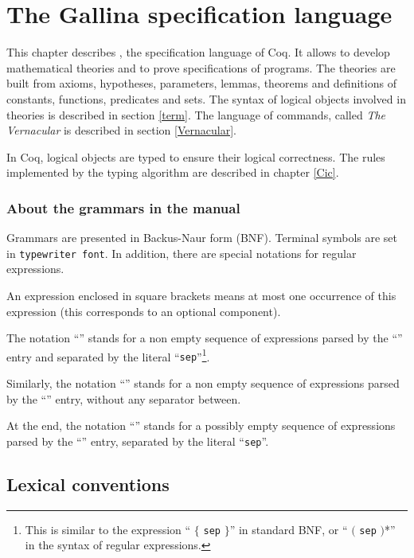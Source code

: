 \chapter{The {\sf Gallina} specification language}
\label{Gallina}

This chapter describes \gallina, the specification language of Coq.
It allows to develop mathematical theories and to prove specifications
of programs.  The theories are built from axioms, hypotheses,
parameters, lemmas, theorems and definitions of constants, functions,
predicates and sets. The syntax of logical objects involved in
theories is described in section \ref{term}. The language of
commands, called {\em The Vernacular} is described in section
\ref{Vernacular}.

In Coq, logical objects are typed to ensure their logical
correctness. The rules implemented by the typing algorithm are described in
chapter \ref{Cic}.

\subsection*{About the grammars in the manual}

Grammars are presented in Backus-Naur form (BNF). Terminal symbols are
set in {\tt typewriter font}.  In addition, there are special
notations for regular expressions.

An expression enclosed in square brackets \zeroone{\ldots} means at
most one occurrence of this expression (this corresponds to an
optional component).

The notation ``'' stands for a non empty
sequence of expressions parsed by the ``{\gensymbol}'' entry and
separated by the literal ``{\tt sep}''\footnote{This is similar to the
expression ``{\gensymbol} $\{$ {\tt sep} {\gensymbol} $\}$'' in
standard BNF, or ``{\gensymbol} $($ {\tt sep} {\gensymbol} $)$*'' in
the syntax of regular expressions.}.

Similarly, the notation ``\nelist{\gensymbol}{}'' stands for a non
empty sequence of expressions parsed by the ``{\gensymbol}'' entry,
without any separator between.

At the end, the notation ``'' stands for a
possibly empty sequence of expressions parsed by the ``{\gensymbol}'' entry,
separated by the literal ``{\tt sep}''.

\section{Lexical conventions}
\label{lexical}

